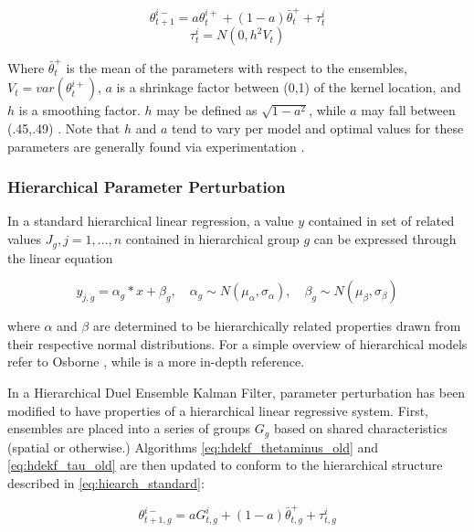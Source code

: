 \begin{equation}\label{eq:hdekf_thetaminus_old}
\theta_{t+1}^{i-} = a\theta_{t}^{i+} + (1-a)\bar{\theta}_{t}^{+} + \tau_{t}^{i}
\end{equation}
\begin{equation}\label{eq:hdekf_tau_old}
\tau_{t}^{i} = N(0, h^{2}V_{t})
\end{equation}

Where $\bar{\theta}_{t}^{+}$ is the mean of the parameters with respect to the ensembles, $V_{t} = var(\theta_{t}^{i+})$, $a$ is a shrinkage factor between (0,1) of the kernel location, and $h$ is a smoothing factor. $h$ may be defined as $\sqrt{1-a^{2}}$, while $a$ may fall between (.45,.49)  \cite{Chen2008}. Note that $h$ and $a$ tend to vary per model and optimal values for these parameters are generally found via experimentation  \cite{Moradkhani2005}  \cite{Anderson1999} \cite{Annan2005} \cite{Chen2008}.

\subsubsection{Hierarchical Parameter Perturbation}

In a standard hierarchical linear regression, a value $y$ contained in set of related values $J_{g}, j=1,...,n$ contained in hierarchical group $g$ can be expressed through the linear equation

\begin{equation}\label{eq:hiearch_standard}
y_{j,g} = \alpha_{g} * x + \beta_{g}, \quad \alpha_{g} \sim N( \mu_{\alpha}, \sigma_{\alpha} ), \quad \beta_{g} \sim N( \mu_{\beta} , \sigma_{\beta} )
\end{equation}

where $\alpha$ and $\beta$ are determined to be hierarchically related properties drawn from their respective normal distributions. For a simple overview of hierarchical models refer to Osborne \cite{Osborne2000}, while \cite{Gelman2013} is a more in-depth reference.

In a Hierarchical Duel Ensemble Kalman Filter, parameter perturbation has been modified to have properties of a hierarchical linear regressive system. First, ensembles are placed into a series of groups $G_{g}$ based on shared characteristics (spatial or otherwise.) Algorithms \eqref{eq:hdekf_thetaminus_old} and \eqref{eq:hdekf_tau_old} are then updated to conform to the hierarchical structure described in \eqref{eq:hiearch_standard}:

\begin{equation}\label{eq:hdekf_theta}
\theta_{t+1,g}^{i-} = a G_{t,g}^{i} + (1-a)\bar{\theta}_{t,g}^{+} + \tau_{t,g}^{i}
\end{equation}

